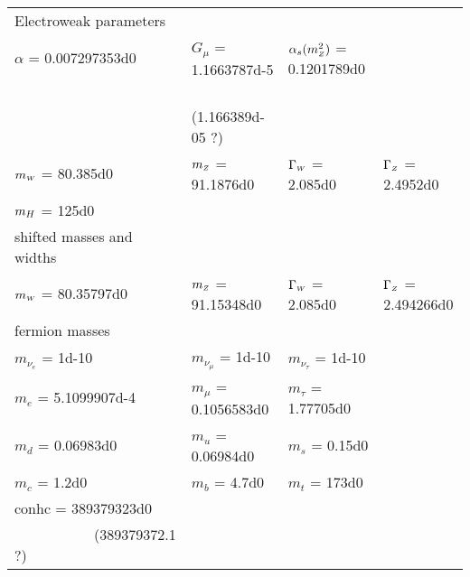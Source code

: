 \begin{tabular}{llll}
Electroweak parameters & &\\  
  $\alpha$                 = 0.007297353d0 &
  $G_\mu$                   = 1.1663787d-5  &
  $\alpha_s(m_{\scriptscriptstyle Z}^2)$        = 0.1201789d0 &\\
  &~~~~~~~ (1.166389d-05 ?) & & \\
  $m_{\scriptscriptstyle W}$                    = 80.385d0 &
  $m_{\scriptscriptstyle Z}$                    = 91.1876d0 & 
  $\Gamma_{\scriptscriptstyle W}$           = 2.085d0 & 
  $\Gamma_{\scriptscriptstyle Z}$           = 2.4952d0  \\
  $m_H$                    = 125d0 & & & \\
  shifted  masses and widths & &\\
  $m_{\scriptscriptstyle W}$                    = 80.35797d0 &
   $m_{\scriptscriptstyle Z}$                    = 91.15348d0 & 
  $\Gamma_{\scriptscriptstyle W}$          = 2.085d0 & 
   $\Gamma_{\scriptscriptstyle Z}$          = 2.494266d0  \\
     fermion masses & & & \\
  $m_{\nu_e}$        = 1d-10 &
  $m_{\nu_\mu}$       = 1d-10 &
  $m_{\nu_\tau}$      = 1d-10 &  \\
  $m_e$             = 5.1099907d-4 &
  $m_\mu$           = 0.1056583d0 &
  $m_\tau$          = 1.77705d0 & \\
  $m_d$                   = 0.06983d0 &
  $m_u$                   = 0.06984d0 &
  $m_s$                   = 0.15d0 & \\
  $m_c$                   = 1.2d0 &
  $m_b$                   = 4.7d0 &
  $m_t$                   = 173d0 & \\
  conhc                    = 389379323d0  & & & \\
  ~~~~~~~~~~~(389379372.1 ?) & & & \\
\end{tabular}
